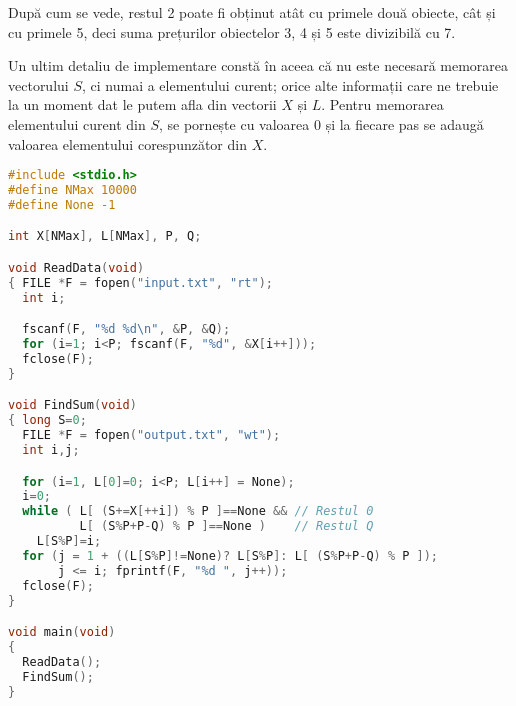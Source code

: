 După cum se vede, restul 2 poate fi obținut atât cu primele două obiecte, cât
și cu primele 5, deci suma prețurilor obiectelor 3, 4 și 5 este divizibilă cu
7.

Un ultim detaliu de implementare constă în aceea că nu este necesară memorarea
vectorului $S$, ci numai a elementului curent; orice alte informații care ne
trebuie la un moment dat le putem afla din vectorii $X$ și $L$. Pentru
memorarea elementului curent din $S$, se pornește cu valoarea 0 și la fiecare
pas se adaugă valoarea elementului corespunzător din $X$.

\begin{lstlisting}[language=C]
#include <stdio.h>
#define NMax 10000
#define None -1

int X[NMax], L[NMax], P, Q;

void ReadData(void)
{ FILE *F = fopen("input.txt", "rt");
  int i;

  fscanf(F, "%d %d\n", &P, &Q);
  for (i=1; i<P; fscanf(F, "%d", &X[i++]));
  fclose(F);
}

void FindSum(void)
{ long S=0;
  FILE *F = fopen("output.txt", "wt");
  int i,j;

  for (i=1, L[0]=0; i<P; L[i++] = None);
  i=0;
  while ( L[ (S+=X[++i]) % P ]==None && // Restul 0
          L[ (S%P+P-Q) % P ]==None )    // Restul Q
    L[S%P]=i;
  for (j = 1 + ((L[S%P]!=None)? L[S%P]: L[ (S%P+P-Q) % P ]);
       j <= i; fprintf(F, "%d ", j++));
  fclose(F);
}

void main(void)
{
  ReadData();
  FindSum();
}
\end{lstlisting}
